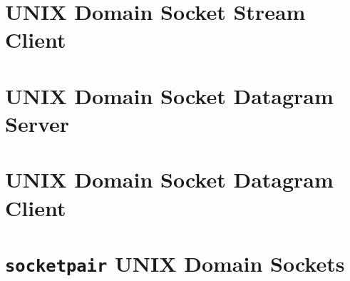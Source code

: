 \section{UNIX Domain Socket Stream Client}
\label{appendix:unixStreamClient}


\section{UNIX Domain Socket Datagram Server}
\label{appendix:unixDgramServer}


\section{UNIX Domain Socket Datagram Client}
\label{appendix:unixDgramClient}


\section{\texttt{socketpair} UNIX Domain Sockets}
\label{appendix:unixSocketpair}

